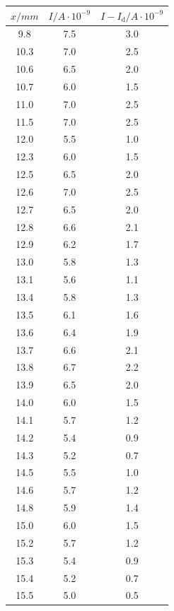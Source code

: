 \begin{table}
\centering
\begin{minipage}{0.46\textwidth}
    \centering
	\begin{tabular}{c|c|c}
		\toprule
		{$x / mm$} & {$I / A\cdot10^{-9}$} & {$I - I_\text{d} / A\cdot10^{-9}$}\\
		\hline
        \midrule
        9.8 &7.5&3.0\\
        10.3 &7.0&2.5\\
        10.6 &6.5&2.0\\
        10.7 &6.0&1.5\\
        11.0 &7.0&2.5\\
        11.5 &7.0&2.5\\
        12.0 &5.5&1.0\\
        12.3 &6.0&1.5\\
        12.5 &6.5&2.0\\
        12.6 &7.0&2.5\\
        12.7 &6.5&2.0\\
        12.8 &6.6&2.1\\
        12.9 &6.2&1.7\\
        13.0 &5.8&1.3\\
        13.1 &5.6&1.1\\
        13.4 &5.8&1.3\\
        13.5 &6.1&1.6\\
        13.6 &6.4&1.9\\
        13.7 &6.6&2.1\\
        13.8 &6.7&2.2\\
        13.9 &6.5&2.0\\
        14.0 &6.0&1.5\\
        14.1 &5.7&1.2\\
        14.2 &5.4&0.9\\
        14.3 &5.2&0.7\\
        14.5 &5.5&1.0\\
        14.6 &5.7&1.2\\
        14.8 &5.9&1.4\\
        15.0 &6.0&1.5\\
        15.2 &5.7&1.2\\
        15.3 &5.4&0.9\\
        15.4 &5.2&0.7\\
        15.5 &5.0&0.5\\
		\bottomrule 
	\end{tabular}
\end{minipage}

\end{table}
